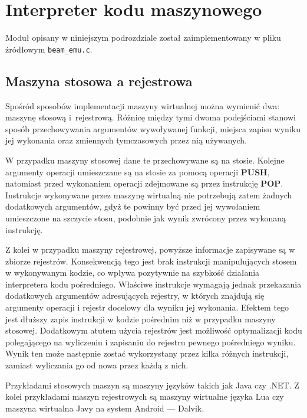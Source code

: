 \section{Interpreter kodu maszynowego}
\label{sec:maszynaInterpreter}

Moduł opisany w niniejszym podrozdziale został zaimplementowany w pliku źródłowym \texttt{beam\_emu.c}.

\subsection{Maszyna stosowa a rejestrowa}
\label{sub:interpreterStosowa}

Spośród sposobów implementacji maszyny wirtualnej można wymienić dwa: maszynę stosową i~rejestrową.
Różnicę między tymi dwoma podejściami stanowi sposób przechowywania argumentów wywoływanej funkcji, miejsca zapisu wyniku jej wykonania oraz zmiennych tymczasowych przez nią używanych.

W przypadku maszyny stosowej dane te przechowywane są na stosie. Kolejne argumenty operacji umieszczane są na stosie za pomocą operacji \textbf{PUSH}, natomiast przed wykonaniem operacji zdejmowane są przez instrukcję \textbf{POP}. Instrukcje wykonywane przez maszynę wirtualną nie potrzebują zatem żadnych dodatkowych argumentów, gdyż te powinny być przed jej wywołaniem umieszczone na szczycie stosu, podobnie jak wynik zwrócony przez wykonaną instrukcję.

Z kolei w przypadku maszyny rejestrowej, powyższe informacje zapisywane są w zbiorze rejestrów.
Konsekwencją tego jest brak instrukcji manipulujących stosem w wykonywanym kodzie, co wpływa pozytywnie na szybkość działania interpretera kodu pośredniego.
Właściwe instrukcje wymagają jednak przekazania dodatkowych argumentów adresujących rejestry, w których znajdują się argumenty operacji i rejestr docelowy dla wyniku jej wykonania.
Efektem tego jest dłuższy zapis instrukcji w kodzie pośrednim niż w przypadku maszyny stosowej.
Dodatkowym atutem użycia rejestrów jest możliwość optymalizacji kodu polegającego na wyliczeniu i zapisaniu do rejestru pewnego pośredniego wyniku.
Wynik ten może następnie zostać wykorzystany przez kilka różnych instrukcji, zamiast wyliczania go od nowa przez każdą z nich.

Przykładami stosowych maszyn są maszyny języków takich jak Java czy .NET.
Z kolei przykładami maszyn rejestrowych są maszyny wirtualne języka Lua czy maszyna wirtualna Javy na system Android --- Dalvik.

